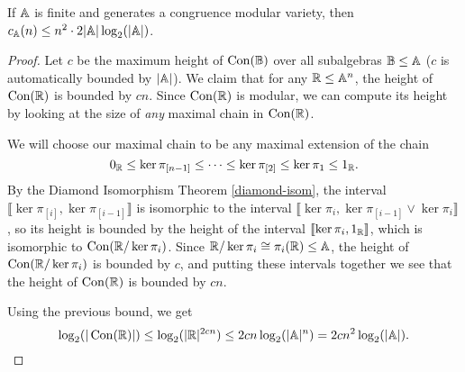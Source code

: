 \documentclass[letterpaper,11pt]{article}
\DeclareMathOperator{\Con}{Con}
\begin{document}
\begin{cor} If $\mathbb{A}$ is finite and generates a congruence modular variety, then $c_{\mathbb{A}}(n) \le n^2 \cdot 2|\mathbb{A}|\log_2(|\mathbb{A}|)$.
\end{cor}
\begin{proof} Let $c$ be the maximum height of $\Con(\bB)$ over all subalgebras $\mathbb{B} \le \mathbb{A}$ ($c$ is automatically bounded by $|\mathbb{A}|$). We claim that for any $\mathbb{R} \le \mathbb{A}^n$, the height of $\Con(\RR)$ is bounded by $cn$. Since $\Con(\RR)$ is modular, we can compute its height by looking at the size of \emph{any} maximal chain in $\Con(\RR)$.

We will choose our maximal chain to be any maximal extension of the chain
\[
0_{\mathbb{R}} \le \ker \pi_{[n-1]} \le \cdots \le \ker \pi_{[2]} \le \ker \pi_1 \le 1_{\mathbb{R}}.
\]
By the Diamond Isomorphism Theorem \ref{diamond-isom}, the interval $\llbracket \ker \pi_{[i]}, \ker \pi_{[i-1]} \rrbracket$ is isomorphic to the interval $\llbracket \ker \pi_i, \ker \pi_{[i-1]}\vee \ker \pi_i\rrbracket$, so its height is bounded by the height of the interval $\llbracket \ker \pi_i, 1_{\mathbb{R}} \rrbracket$, which is isomorphic to $\Con(\RR/\ker \pi_i)$. Since $\mathbb{R}/\ker \pi_i \cong \pi_i(\mathbb{R}) \le \mathbb{A}$, the height of $\Con(\RR/\ker \pi_i)$ is bounded by $c$, and putting these intervals together we see that the height of $\Con(\RR)$ is bounded by $cn$.

Using the previous bound, we get
\[
\log_2(|\Con(\RR)|) \le \log_2(|\RR|^{2cn}) \le 2cn \log_2(|\bA|^n) = 2cn^2 \log_2(|\bA|).\qedhere
\]
\end{proof}
\end{document}
